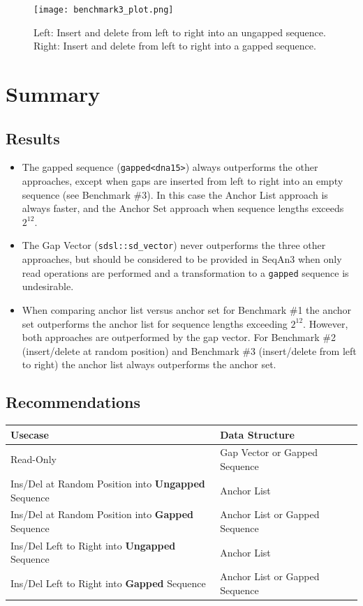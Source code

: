 \documentclass[11pt, letterpaper, twoside]{article}
\begin{document}
\begin{figure}\centering
\texttt{[image: benchmark3\_plot.png]}
\caption{Left: Insert and delete from left to right into an ungapped sequence. Right: 
Insert and delete from left to right into a gapped sequence.}
\end{figure}

\section{Summary}
\subsection{Results}
\begin{itemize}
	\item The gapped sequence (\verb|gapped<dna15>|) always outperforms the other approaches, except when gaps are inserted from left to right into an empty sequence (see Benchmark \#3). In this case the Anchor List approach is always faster, and the Anchor Set approach when sequence lengths exceeds $2^{12}$.
	\item The Gap Vector (\verb|sdsl::sd_vector|) never outperforms the three other approaches, but should be considered to be provided in SeqAn3 when only read operations are performed and a transformation to a \verb|gapped| sequence is undesirable. 
	\item When comparing anchor list versus anchor set for Benchmark \#1 the anchor set outperforms the anchor list for sequence lengths exceeding $2^{12}$. However, both approaches are outperformed by the gap vector. For Benchmark \#2 (insert/delete at random position) and Benchmark \#3 (insert/delete from left to right) the anchor list always outperforms the anchor set.    
\end{itemize}

\subsection{Recommendations}
\begin{table}[htpb]\centering
\begin{tabular}{|l|l|l|}
\hline
\bf Usecase&\bf Data Structure\\
\hline
Read-Only&Gap Vector or Gapped Sequence\\
\hline
Ins/Del at Random Position into {\bf Ungapped} Sequence&Anchor List\\
\hline
Ins/Del at Random Position into {\bf Gapped} Sequence&Anchor List or Gapped Sequence\\
\hline
Ins/Del Left to Right into {\bf Ungapped} Sequence&Anchor List\\
\hline
Ins/Del Left to Right into {\bf Gapped} Sequence&Anchor List or Gapped Sequence\\
\hline
\end{tabular}
\end{table}
\end{document}
